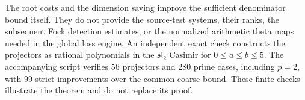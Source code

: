 The root costs and the dimension saving improve the sufficient
denominator bound itself.  They do not provide the source-test
systems, their ranks, the subsequent Fock detection estimates, or
the normalized arithmetic theta maps needed in the global loss
engine.  An independent exact check constructs the projectors as
rational polynomials in the $\mathfrak{sl}_2$ Casimir for
$0\le a\le b\le5$.  The accompanying script verifies 56 projectors
and 280 prime cases, including $p=2$, with 99 strict improvements
over the common coarse bound.  These finite checks illustrate the
theorem and do not replace its proof.
